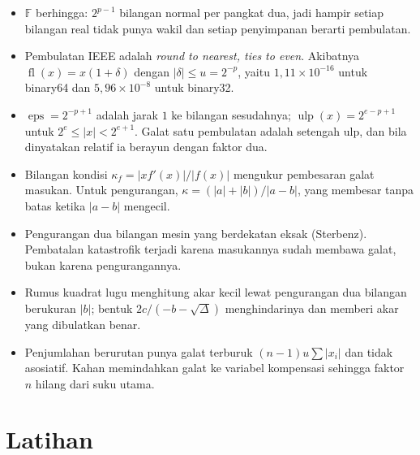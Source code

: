 \begin{ringkasan}
\begin{itemize}
  \item $\mathbb{F}$ berhingga: $2^{p-1}$ bilangan normal per pangkat dua, jadi
        hampir setiap bilangan real tidak punya wakil dan setiap penyimpanan berarti
        pembulatan.
  \item Pembulatan IEEE adalah \emph{round to nearest, ties to even}. Akibatnya
        $\operatorname{fl}(x)=x(1+\delta)$ dengan $|\delta|\le u=2^{-p}$, yaitu
        $1{,}11\times10^{-16}$ untuk binary64 dan $5{,}96\times10^{-8}$ untuk
        binary32.
  \item $\operatorname{eps}=2^{-p+1}$ adalah jarak $1$ ke bilangan sesudahnya;
        $\operatorname{ulp}(x)=2^{e-p+1}$ untuk $2^{e}\le|x|<2^{e+1}$. Galat satu
        pembulatan adalah setengah ulp, dan bila dinyatakan relatif ia berayun dengan
        faktor dua.
  \item Bilangan kondisi $\kappa_{f}=|xf'(x)|/|f(x)|$ mengukur pembesaran galat
        masukan. Untuk pengurangan, $\kappa=(|a|+|b|)/|a-b|$, yang membesar tanpa
        batas ketika $|a-b|$ mengecil.
  \item Pengurangan dua bilangan mesin yang berdekatan eksak (Sterbenz). Pembatalan
        katastrofik terjadi karena masukannya sudah membawa galat, bukan karena
        pengurangannya.
  \item Rumus kuadrat lugu menghitung akar kecil lewat pengurangan dua bilangan
        berukuran $|b|$; bentuk $2c/(-b-\sqrt{\Delta})$ menghindarinya dan memberi akar
        yang dibulatkan benar.
  \item Penjumlahan berurutan punya galat terburuk $(n-1)u\sum|x_{i}|$ dan tidak
        asosiatif. Kahan memindahkan galat ke variabel kompensasi sehingga faktor $n$
        hilang dari suku utama.
\end{itemize}
\end{ringkasan}

\section{Latihan}

